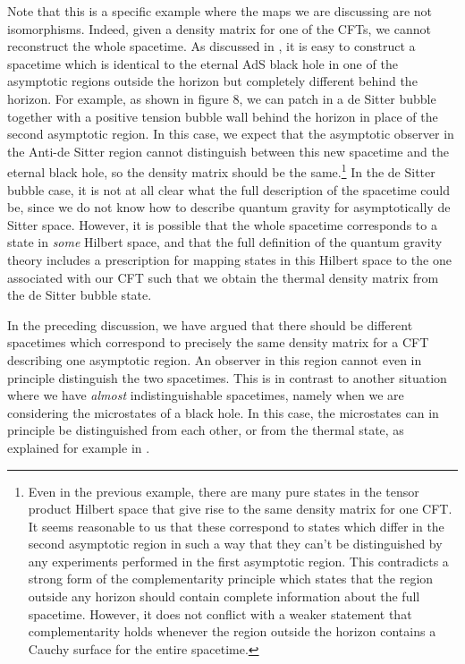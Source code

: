 \documentclass[12pt,epsf]{article}
\renewcommand{\(}{\left(}
\renewcommand{\)}{\right)}
\begin{document}
Note that this is a specific example where the maps we are discussing are not isomorphisms. Indeed, given a density matrix for one of the CFTs, we cannot reconstruct the whole spacetime. As discussed in \cite{fhmmrs}, it is easy to construct a spacetime which is identical to the eternal AdS black hole in one of the asymptotic regions outside the horizon but completely different behind the horizon. For example, as shown in figure 8, we can patch in a de Sitter bubble together with a positive tension bubble wall behind the horizon in place of the second asymptotic region. In this case, we expect that the asymptotic observer in the Anti-de Sitter region cannot distinguish between this new spacetime and the eternal black hole, so the density matrix should be the same.\footnote{Even in the previous example, there are many pure states in the tensor product Hilbert space that give rise to the same density matrix for one CFT. It seems reasonable to us that these correspond to states which differ in the second asymptotic region in such a way that they can't be distinguished by any experiments performed in the first asymptotic region. This contradicts a strong form of the complementarity principle which states that the region outside any horizon should contain complete information about the full spacetime. However, it does not conflict with a weaker statement that complementarity holds whenever the region outside the horizon contains a Cauchy surface for the entire spacetime.} In the de Sitter bubble case, it is not at all clear what the full description of the spacetime could be, since we do not know how to describe quantum gravity for asymptotically de Sitter space. However, it is possible that the whole spacetime corresponds to a state in {\it some} Hilbert space, and that the full definition of the quantum gravity theory includes a prescription for mapping states in this Hilbert space to the one associated with our CFT such that we obtain the thermal density matrix from the de Sitter bubble state.

In the preceding discussion, we have argued that there should be different spacetimes which correspond to precisely the same density matrix for a CFT describing one asymptotic region. An observer in this region cannot even in principle distinguish the two spacetimes. This is in contrast to another situation where we have {\it almost} indistinguishable spacetimes, namely when we are considering the microstates of a black hole. In this case, the microstates can in principle be distinguished from each other, or from the thermal state, as explained for example in \cite{bchlrs}.
\end{document}
